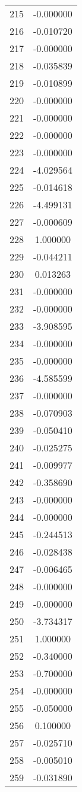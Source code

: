 \documentclass[12pt]{article}
\begin{document}
\begin{longtable}{@{}cc@{}}
215 & -0.000000 \\
216 & -0.010720 \\
217 & -0.000000 \\
218 & -0.035839 \\
219 & -0.010899 \\
220 & -0.000000 \\
221 & -0.000000 \\
222 & -0.000000 \\
223 & -0.000000 \\
224 & -4.029564 \\
225 & -0.014618 \\
226 & -4.499131 \\
227 & -0.000609 \\
228 & 1.000000 \\
229 & -0.044211 \\
230 & 0.013263 \\
231 & -0.000000 \\
232 & -0.000000 \\
233 & -3.908595 \\
234 & -0.000000 \\
235 & -0.000000 \\
236 & -4.585599 \\
237 & -0.000000 \\
238 & -0.070903 \\
239 & -0.050410 \\
240 & -0.025275 \\
241 & -0.009977 \\
242 & -0.358690 \\
243 & -0.000000 \\
244 & -0.000000 \\
245 & -0.244513 \\
246 & -0.028438 \\
247 & -0.006465 \\
248 & -0.000000 \\
249 & -0.000000 \\
250 & -3.734317 \\
251 & 1.000000 \\
252 & -0.340000 \\
253 & -0.700000 \\
254 & -0.000000 \\
255 & -0.050000 \\
256 & 0.100000 \\
257 & -0.025710 \\
258 & -0.005010 \\
259 & -0.031890 \\

\end{longtable}
\end{document}
